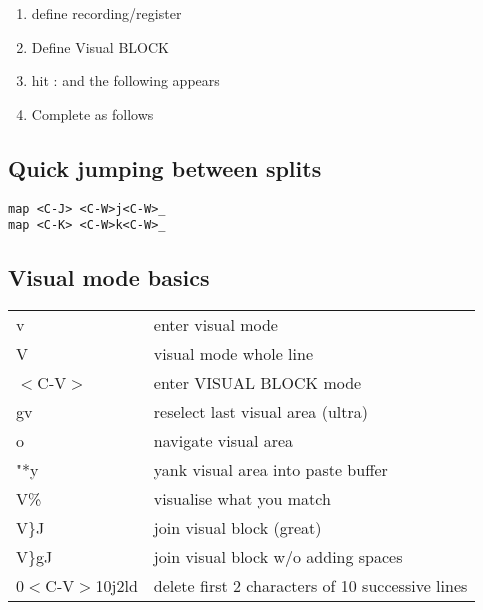  \begin{enumerate}
 \item define recording/register


 \item Define Visual BLOCK

 \item hit : and the following appears
 \begin{list}{}
    \item :'$<$,'$>$
 \end{list}

 \item Complete as follows
 \begin{list}{}
    \item :'$<$,'$>$norm @q
 \end{list}

 \end{enumerate}

\subsection{Quick jumping between splits}

\begin{verbatim}
map <C-J> <C-W>j<C-W>_
map <C-K> <C-W>k<C-W>_
\end{verbatim}

\subsection{Visual mode basics}
\begin{center}
\begin{longtable}{l|l}
v & enter visual mode\\
V & visual mode whole line\\
$<$C-V$>$ & enter VISUAL BLOCK mode\\
gv & reselect last visual area (ultra)\\
o & navigate visual area\\
"*y & yank visual area into paste buffer\\
V\% & visualise what you match\\
V\}J & join visual block (great)\\
V\}gJ & join visual block w/o adding spaces\\
0$<$C-V$>$10j2ld & delete first 2 characters of 10 successive lines
\end{longtable}
\end{center}

